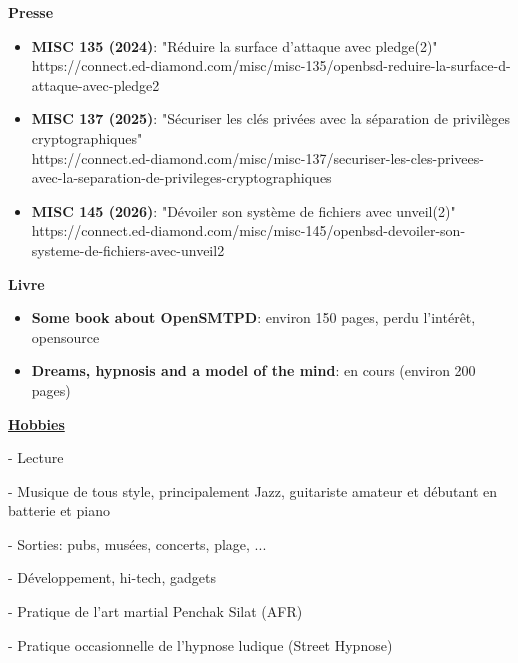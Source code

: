 \documentclass[a4paper,10pt]{letter}
\begin{document}
\textbf{Presse}
\begin{itemize}
\item	\textbf{MISC 135 (2024)}: "R\'eduire la surface d'attaque avec pledge(2)"\\
  https://connect.ed-diamond.com/misc/misc-135/openbsd-reduire-la-surface-d-attaque-avec-pledge2\\
\item	\textbf{MISC 137 (2025)}: "S\'ecuriser les cl\'es priv\'ees avec la s\'eparation de privil\`eges cryptographiques"\\
  https://connect.ed-diamond.com/misc/misc-137/securiser-les-cles-privees-avec-la-separation-de-privileges-cryptographiques\\
\item	\textbf{MISC 145 (2026)}: "D\'evoiler son syst\`eme de fichiers avec unveil(2)"\\
  https://connect.ed-diamond.com/misc/misc-145/openbsd-devoiler-son-systeme-de-fichiers-avec-unveil2\\
\end{itemize}


\textbf{Livre}
\begin{itemize}
\item	\textbf{Some book about OpenSMTPD}: environ 150 pages, perdu l'int\'er\^et, opensource
\item	\textbf{Dreams, hypnosis and a model of the mind}: en cours (environ 200 pages)\\
\end{itemize}


\underline{\textbf{Hobbies}}\\
\begin{description}
\item - Lecture
\item - Musique de tous style, principalement Jazz, guitariste amateur et d\'ebutant en batterie et piano
\item - Sorties: pubs, mus\'ees, concerts, plage, ...
\item - D\'eveloppement, hi-tech, gadgets
\item - Pratique de l'art martial Penchak Silat (AFR)
\item - Pratique occasionnelle de l'hypnose ludique (Street Hypnose)\\
\end{description}
\end{document}
